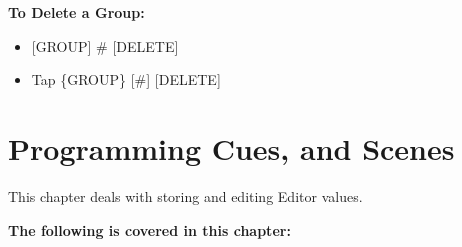 \documentclass[
]{article}
\begin{document}
\textbf{To Delete a Group:}

\begin{itemize}
\item
  {[}GROUP{]} \# {[}DELETE{]}
\item
  Tap \{GROUP\} {[}\#{]} {[}DELETE{]}
\end{itemize}

\hypertarget{programming-cues-and-scenes}{%
\section{Programming Cues, and Scenes}\label{programming-cues-and-scenes}}

This chapter deals with storing and editing Editor values.

\textbf{The following is covered in this chapter:}
\end{document}
